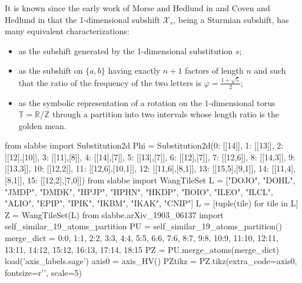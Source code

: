 \documentclass[12pt]{amsart}
\newcommand{\Z}{\mathbb{Z}}
\newcommand{\R}{\mathbb{R}}
\newcommand{\Xcal}{\mathcal{X}} %
\newcommand{\torus}{\mathbb{T}}
\begin{document}
It is known since the early work of Morse and Hedlund in \cite{MR0000745} 
and Coven and Hedlund in \cite{MR0322838}
that the 1-dimensional subshift $\Xcal_s$,
being a Sturmian subshift,
has many equivalent characterizations:
\begin{itemize}
    \item as the subshift generated by the 1-dimensional substitution $s$;
    \item as the subshift on $\{a,b\}$ having exactly $n+1$ factors of length $n$ and
        such that the ratio of the frequency of the two letters is $\varphi=\frac{1+\sqrt{5}}{2}$;
    \item as the symbolic representation of a rotation on the $1$-dimensional
        torus $\torus=\R/\Z$ through a partition into two intervals
        whose length ratio is the golden mean.
\end{itemize}

\begin{sagesilent}
from slabbe import Substitution2d
Phi = Substitution2d({0: [[14]], 1: [[13]], 2: [[12],[10]],
        3: [[11],[8]], 4: [[14],[7]], 5: [[13],[7]], 6: [[12],[7]],
        7: [[12,6]], 8: [[14,3]], 9: [[13,3]], 10: [[12,2]],
        11: [[12,6],[10,1]], 12: [[11,6],[8,1]], 13: [[15,5],[9,1]],
        14: [[11,4],[8,1]], 15: [[12,2],[7,0]]})
from slabbe import WangTileSet
L = ["DOJO", "DOHL", "JMDP", "DMDK", "HPJP", "HPHN", "HKDP",
     "BOIO", "ILEO", "ILCL", "ALIO", "EPIP", "IPIK",
     "IKBM", "IKAK", "CNIP"]
L = [tuple(tile) for tile in L]
Z = WangTileSet(L)
from slabbe.arXiv_1903_06137 import self_similar_19_atoms_partition
PU = self_similar_19_atoms_partition()
merge_dict = {0:0, 1:1, 2:2, 3:3, 4:4, 5:5, 6:6, 7:6, 8:7, 9:8, 10:9, 
              11:10, 12:11, 13:11, 14:12, 15:12, 16:13, 17:14, 18:15}
PZ = PU.merge_atoms(merge_dict)
load('axis_labels.sage')
axis0 = axis_HV()
PZtikz = PZ.tikz(extra_code=axis0, fontsize=r'\normalsize', scale=5)
\end{sagesilent}
\end{document}

